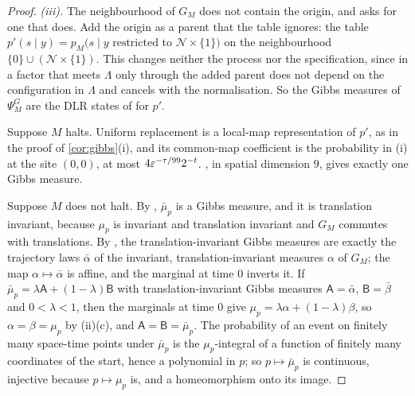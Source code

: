 \begin{proof}
\emph{(iii).} The neighbourhood of $G_M$ does not contain the origin, and \cite{DM26} asks for one that does. Add the origin as a parent that the table ignores: the table $p'(s\mid y)=p_M\bigl(s\mid y\text{ restricted to }\mathcal N\times\{1\}\bigr)$ on the neighbourhood $\{0\}\cup(\mathcal N\times\{1\})$. This changes neither the process nor the specification, since in \cite[eq.~(6)]{DM26} a factor that meets $\Lambda$ only through the added parent does not depend on the configuration in $\Lambda$ and cancels with the normalisation. So the Gibbs measures of $\Psi^G_M$ are the DLR states of \cite{DM26} for $p'$.

Suppose $M$ halts. Uniform replacement is a local-map representation of $p'$, as in the proof of \cref{cor:gibbs}(i), and its common-map coefficient is the probability in (i) at the site $(0,0)$, at most $4\varepsilon^{-\tau/99}2^{-t}$. \cite[Corollary~13.7]{DM26}, in spatial dimension $9$, gives exactly one Gibbs measure.

Suppose $M$ does not halt. By \cite[Lemma~2.4]{DM26}, $\bar\mu_p$ is a Gibbs measure, and it is translation invariant, because $\mu_p$ is invariant and translation invariant and $G_M$ commutes with translations. By \cite[Corollary~10.4]{DM26}, the translation-invariant Gibbs measures are exactly the trajectory laws $\bar\alpha$ of the invariant, translation-invariant measures $\alpha$ of $G_M$; the map $\alpha\mapsto\bar\alpha$ is affine, and the marginal at time $0$ inverts it. If $\bar\mu_p=\lambda\mathsf A+(1-\lambda)\mathsf B$ with translation-invariant Gibbs measures $\mathsf A=\bar\alpha$, $\mathsf B=\bar\beta$ and $0<\lambda<1$, then the marginals at time $0$ give $\mu_p=\lambda\alpha+(1-\lambda)\beta$, so $\alpha=\beta=\mu_p$ by (ii)(c), and $\mathsf A=\mathsf B=\bar\mu_p$. The probability of an event on finitely many space-time points under $\bar\mu_p$ is the $\mu_p$-integral of a function of finitely many coordinates of the start, hence a polynomial in $p$; so $p\mapsto\bar\mu_p$ is continuous, injective because $p\mapsto\mu_p$ is, and a homeomorphism onto its image.


\end{proof}
